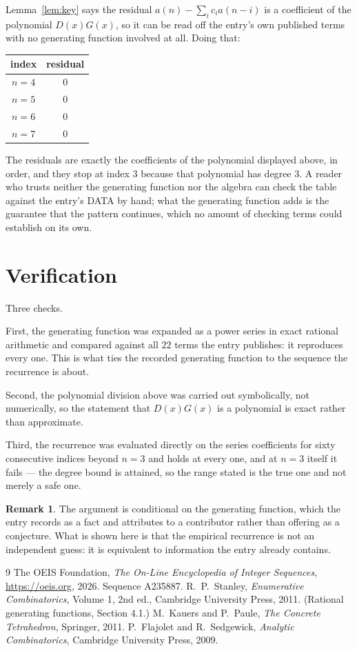 \documentclass[11pt,a4paper]{article}
\theoremstyle{plain}
\theoremstyle{definition}
\newtheorem{remark}[theorem]{Remark}
\begin{document}
Lemma~\ref{lem:key} says the residual $a(n)-\sum_ic_ia(n-i)$ is a coefficient of the
polynomial $D(x)G(x)$, so it can be read off the entry's own published terms with no
generating function involved at all. Doing that:
\begin{center}
\begin{tabular}{cc}
index & residual \\ \hline
$n=4$ & $0$ \\
$n=5$ & $0$ \\
$n=6$ & $0$ \\
$n=7$ & $0$
\end{tabular}
\end{center}
The residuals are exactly the coefficients of the polynomial displayed above, in order, and
they stop at index $3$ because that polynomial has degree $3$. A reader who trusts
neither the generating function nor the algebra can check the table against the entry's DATA
by hand; what the generating function adds is the guarantee that the pattern continues, which
no amount of checking terms could establish on its own.

\section{Verification}

Three checks.

First, the generating function was expanded as a power series in exact rational arithmetic and
compared against all $22$ terms the entry publishes: it reproduces every one. This is
what ties the recorded generating function to the sequence the recurrence is about.

Second, the polynomial division above was carried out symbolically, not numerically, so the
statement that $D(x)G(x)$ is a polynomial is exact rather than approximate.

Third, the recurrence was evaluated directly on the series coefficients for sixty consecutive
indices beyond $n=3$ and holds at every one, and at $n=3$ itself it fails --- the
degree bound is attained, so the range stated is the true one and not merely a safe one.

\begin{remark}
The argument is conditional on the generating function, which the entry records as a fact and
attributes to a contributor rather than offering as a conjecture. What is shown here is that
the empirical recurrence is not an independent guess: it is equivalent to information the
entry already contains.
\end{remark}

\begin{thebibliography}{9}
 The OEIS Foundation, \emph{The On-Line Encyclopedia of Integer
Sequences}, \url{https://oeis.org}, 2026. Sequence A235887.
 R.~P.~Stanley, \emph{Enumerative Combinatorics}, Volume 1, 2nd ed.,
Cambridge University Press, 2011. (Rational generating functions, Section 4.1.)
 M.~Kauers and P.~Paule, \emph{The Concrete Tetrahedron}, Springer, 2011.
 P.~Flajolet and R.~Sedgewick, \emph{Analytic Combinatorics}, Cambridge
University Press, 2009.
\end{thebibliography}
\end{document}
